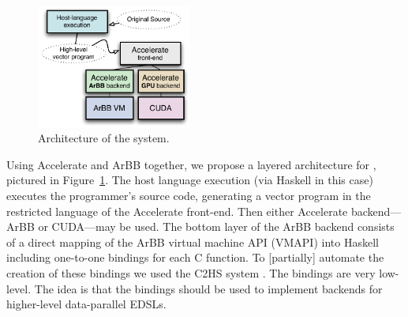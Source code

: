 

\begin{figure}
  \begin{center}
   \includegraphics[width=2.0in]{./arbb/figure_architecture}    
  \end{center}
\vspace{-5mm}
  \caption{Architecture of the \systemname{} system.  }
  \label{f:architecture}
\end{figure}


Using Accelerate and ArBB together, we propose a layered architecture
for \systemname{},
pictured in Figure~\ref{f:architecture}. 
The host language execution (via Haskell in this case) executes the
programmer's source code, generating a vector program in the
restricted language of the Accelerate front-end.
Then either Accelerate backend---ArBB or CUDA---may be used.
The 
bottom layer of the ArBB backend consists of a direct mapping of the ArBB virtual machine
API (VMAPI) into Haskell including one-to-one bindings for each C 
function. 
To [partially] automate the creation of these bindings we used the C2HS system . The 
\arbbvmH{} bindings are very low-level.
The idea 
is that the \arbbvmH{} bindings should be used to implement
backends for higher-level data-parallel EDSLs.


